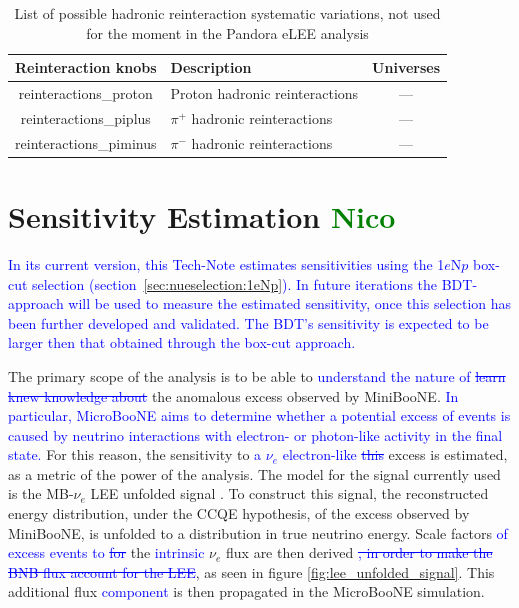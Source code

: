 \documentclass[a4paper]{article}
\newcommand{\nue}{$\nu_e$ }
\begin{document}
\begin{table}[H]
\centering
 \begin{tabular}{| c | m{6cm} | c |} 
    \hline
\hline
Reinteraction knobs & Description & Universes \\
\hline
reinteractions\_proton        &  Proton hadronic reinteractions  & ---\\ 
reinteractions\_piplus   &  $\pi^+$ hadronic reinteractions & ---\\ 
reinteractions\_piminus        & $\pi^-$ hadronic reinteractions  & ---\\ 
\hline
\end{tabular}
\caption{List of possible hadronic reinteraction systematic variations, not used for the moment in the Pandora eLEE analysis}
\label{tab:fluxsyst}
\end{table}

\newpage

\section{Sensitivity Estimation \textcolor{green}{Nico}}
\label{sec:sensitivity}

\par \textcolor{blue}{In its current version, this Tech-Note estimates sensitivities using the 1$e$N$p$ box-cut selection (section~\ref{sec:nueselection:1eNp}). In future iterations the BDT-approach will be used to measure the estimated sensitivity, once this selection has been further developed and validated. The BDT's sensitivity is expected to be larger then that obtained through the box-cut approach.} 
\par The primary scope of the analysis is to be able to \textcolor{blue}{understand the nature of \st{learn knew knowledge about}} the anomalous excess observed by MiniBooNE. \textcolor{blue}{In particular, MicroBooNE aims to determine whether a potential excess of events is caused by neutrino interactions with electron- or photon-like activity in the final state.}
For this reason, the sensitivity to \textcolor{blue}{a $\nu_e$ electron-like \st{this}} excess is estimated, as a metric of the power of the analysis.
The model for the signal currently used is the MB-$\nu_e$ LEE unfolded signal \cite{bib:sbnfit20437}.
To construct this signal, the reconstructed energy distribution, under the CCQE hypothesis, of the excess observed by MiniBooNE, is unfolded to a distribution in true neutrino energy.
Scale factors \textcolor{blue}{of excess events to \st{for}} the \textcolor{blue}{intrinsic} \nue flux are then derived \textcolor{blue}{\st{, in order to make the BNB flux account for the LEE}}, as seen in figure \ref{fig:lee_unfolded_signal}.
This additional flux \textcolor{blue}{component} is then propagated in the MicroBooNE simulation.
\end{document}
